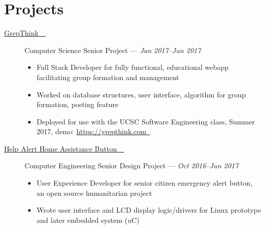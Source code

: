 \documentclass[10pt]{article}
\let\orighref\href
\renewcommand{\href}[2]{\orighref{#1}{#2{\scriptsize~\color{darkgray}\faExternalLink}}}
\renewcommand{\url}[1]{\href{#1}{#1}}
\begin{document}
\section*{Projects}
\begin{description}
  \item[\href{https://github.com/grepthink/grepthink}{GrepThink}] Computer
    Science Senior Project --- \textit{Jan 2017--Jun 2017}
    \begin{itemize}
      \item Full Stack Developer for fully functional, educational webapp
        facilitating group formation and management
      \item Worked on database structures, user interface, algorithm for group
        formation, posting feature
      \item Deployed for use with the UCSC Software Engineering class, Summer
        2017, demo: \url{https://grepthink.com}
    \end{itemize}
  \item[\href{https://github.com/HaHaSDP-UCSC}{Help Alert Home Assistance
    Button}] Computer Engineering Senior Design Project --- \textit{Oct 2016--Jun 2017}
    \begin{itemize}
      \item User Experience Developer for senior citizen emergency alert button,
        an open source humanitarian project
      \item Wrote user interface and LCD display logic/drivers for Linux
        prototype and later embedded system (uC)
    \end{itemize}
\end{description}
\end{document}
